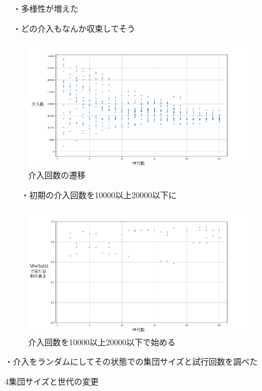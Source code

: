 　・多様性が増えた

　・どの介入もなんか収束してそう

\begin{figure}[h]
    \centering
    \includegraphics[width=10cm]{figures/Experiment1/3-1.png}
    \caption{介入回数の遷移}
\end{figure}

　　・初期の介入回数を10000以上20000以下に

\begin{figure}[h]
    \centering
    \includegraphics[width=10cm]{figures/Experiment1/3-2.png}
    \caption{介入回数を10000以上20000以下で始める}
\end{figure}

・介入をランダムにしてその状態での集団サイズと試行回数を調べた

4集団サイズと世代の変更

